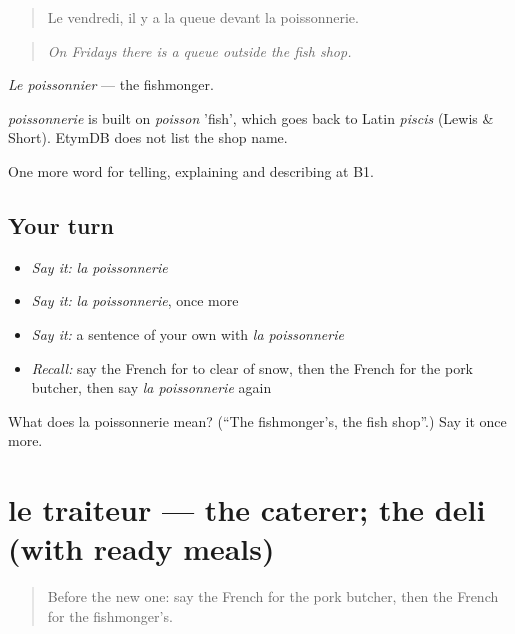 \begin{quote}
Le vendredi, il y a la queue devant la poissonnerie.
\end{quote}

\begin{quote}
\emph{On Fridays there is a queue outside the fish shop.}
\end{quote}

\emph{Le poissonnier} — the fishmonger.

\begin{cousinweb}
\emph{poissonnerie} is built on \emph{poisson} 'fish', which goes back to Latin \emph{piscis} (Lewis \& Short). EtymDB does not list the shop name.
\end{cousinweb}

\begin{grammarlens}[title={What you've built}]
One more word for telling, explaining and describing at B1.
\end{grammarlens}

\subsection*{Your turn}
\begin{itemize}
\raggedright
  \item \emph{Say it:} \emph{la poissonnerie}
  \item \emph{Say it:} \emph{la poissonnerie}, once more
  \item \emph{Say it:} a sentence of your own with \emph{la poissonnerie}
  \item \emph{Recall:} say the French for to clear of snow, then the French for the pork butcher, then say \emph{la poissonnerie} again
\end{itemize}

\begin{tcolorbox}[breakable,colback=teal!4,colframe=teal!35!black,title={Before you move on}]
What does la poissonnerie mean? (\textquotedblleft{}The fishmonger’s, the fish shop\textquotedblright{}.) Say it once more.
\end{tcolorbox}
\section[le traiteur]{le traiteur — the caterer; the deli (with ready meals)}

\label{lesson:FR-C444-traiteur}



\begin{quote}
Before the new one: say the French for the pork butcher, then the French for the fishmonger’s.
\end{quote}

